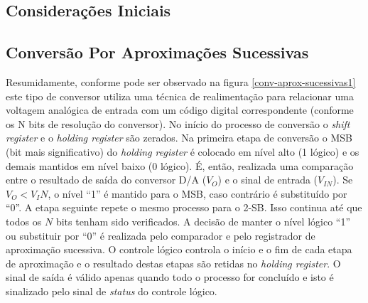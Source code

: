 	\subsection{Considerações Iniciais}
		
	\subsection{Conversão Por Aproximações Sucessivas}
		
		Resumidamente, conforme pode ser observado na figura \ref{conv-aprox-sucessivas1} este tipo de conversor utiliza uma técnica de realimentação para relacionar uma voltagem analógica de entrada com um código digital correspondente (conforme os N bits de resolução do conversor). No início do processo de conversão o \textit{shift register} e o \textit{holding register} são zerados. Na primeira etapa de conversão o MSB (bit mais significativo) do \textit{holding register} é colocado em	nível alto (1 lógico) e os demais mantidos em nível baixo (0 lógico). É, então, realizada uma comparação entre o resultado de saída do conversor D/A ($V_O$) e o sinal de entrada ($V_{IN}$). Se $V_O < V_IN$, o nível “1” é mantido para o MSB, caso contrário é substituído por “0”. A etapa seguinte repete o mesmo processo para o 2-SB. Isso continua até que todos os $N$ bits tenham sido verificados. A decisão de manter o nível lógico “1” ou substituir por “0” é realizada pelo comparador e pelo registrador de aproximação sucessiva. O controle lógico controla o início e o fim de cada etapa de aproximação e o resultado destas etapas são retidas no \textit{holding register}. O sinal de saída é válido apenas quando todo o processo for concluído e isto é sinalizado pelo sinal de \textit{status} do controle lógico.
		
